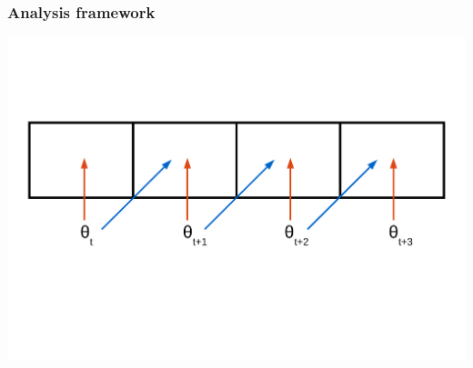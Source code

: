 \documentclass{beamer}
\begin{document}
\begin{frame}
  \frametitle{Analysis framework}
  \begin{center}
    \includegraphics[height = 0.8\textheight, width = \textwidth,  keepaspectratio = true]{figure/predict_perform}
  \end{center}
\end{frame}
\end{document}
